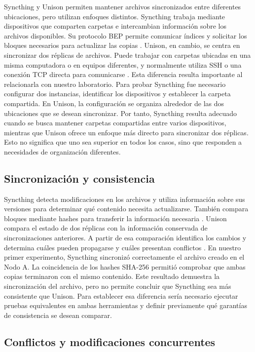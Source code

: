 \documentclass[12pt,a4paper]{article}
\begin{document}
Syncthing y Unison permiten mantener archivos sincronizados entre diferentes ubicaciones, 
pero utilizan enfoques distintos. Syncthing trabaja mediante dispositivos que comparten carpetas e intercambian información sobre los archivos disponibles. Su protocolo BEP permite comunicar índices y solicitar los bloques necesarios para actualizar las copias \cite{syncthingBEP,syncthingSyncing}.
Unison, en cambio, se centra en sincronizar dos réplicas de archivos. Puede trabajar con carpetas ubicadas en 
una misma computadora o en equipos diferentes, y normalmente utiliza SSH o una conexión TCP directa para comunicarse \cite{unisonOfficial}.
Esta diferencia resulta importante al relacionarla con nuestro laboratorio. Para probar Syncthing 
fue necesario configurar dos instancias, identificar los dispositivos y establecer la carpeta compartida. En Unison, la configuración se organiza alrededor de las dos ubicaciones que se desean sincronizar.
Por tanto, Syncthing resulta adecuado cuando se busca mantener carpetas compartidas entre varios dispositivos, mientras que Unison ofrece un enfoque más directo para sincronizar dos réplicas. Esto no significa que uno sea superior en todos los casos, sino que responden a necesidades de organización diferentes.

\subsection{Sincronización y consistencia}

Syncthing detecta modificaciones en los archivos y utiliza información sobre sus versiones para determinar qué contenido necesita actualizarse. También compara 
bloques mediante hashes para transferir la información necesaria \cite{syncthingSyncing}.
Unison compara el estado de dos réplicas con la información conservada de sincronizaciones 
anteriores. A partir de esa comparación identifica los cambios y determina cuáles pueden propagarse y cuáles presentan conflictos \cite{unisonOfficial}.
En nuestro primer experimento, Syncthing sincronizó correctamente el archivo creado en el Nodo A. La coincidencia de los hashes 
SHA-256 permitió comprobar que ambas copias terminaron con el mismo contenido.
Este resultado demuestra la sincronización del archivo, pero no permite concluir que Syncthing sea más consistente que Unison. 
Para establecer esa diferencia sería necesario ejecutar pruebas equivalentes en ambas herramientas y definir previamente qué garantías de consistencia se desean comparar.

\subsection{Conflictos y modificaciones concurrentes}
\end{document}
